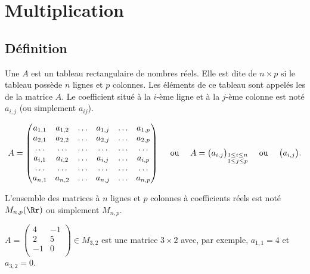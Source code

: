 \documentclass[11pt,class=report,crop=false]{standalone}
\begin{document}

%
%


\section{Multiplication}


\subsection{Définition}

Une  $A$ est un tableau rectangulaire
de nombres réels. 
Elle est dite de  $n \times p$ si le tableau possède $n$ lignes et $p$ colonnes.
Les éléments de ce tableau sont appelés les  de la matrice $A$.
Le coefficient situé à  la $i$-ème ligne et à la $j$-ème colonne est noté $a_{i,j}$ (ou simplement $a_{ij}$).


$$A=\begin{pmatrix}
	a_{1,1}& a_{1,2}& \dots & a_{1,j}& \dots & a_{1,p}\cr
	a_{2,1}& a_{2,2}& \dots & a_{2,j}& \dots &a_{2,p}\cr
	\dots & \dots & \dots & \dots & \dots & \dots \cr
	a_{i,1}& a_{i,2} & \dots & a_{i,j}& \dots &a_{i,p} \cr
	\dots & \dots & \dots & \dots & \dots & \dots \cr
	a_{n,1}& a_{n,2}& \dots & a_{n,j}& \dots & a_{n,p}\cr
\end{pmatrix}
\quad \text{ ou } \quad
A= \big(a_{i,j}\big)_{\substack{1\leq i \leq n \\ 1\leq j \leq p}}
\quad \text{ ou } \quad
\big(a_{i,j}\big).
$$

L'ensemble des matrices à $n$ lignes et $p$ colonnes à
coefficients réels est noté $M_{n,p}(\Rr)$ ou simplement $M_{n,p}$.

\begin{exemple}
$ A  =  \left(
\begin{array}{ccc}
	4 & -1 \\
	2 & 5  \\
	-1 & 0 \\
\end{array}
\right) \in M_{3,2}$
est une matrice $3\times 2$ avec, par exemple, $a_{1,1}=4$ et $a_{3,2}=0$.
\end{exemple}
\end{document}
